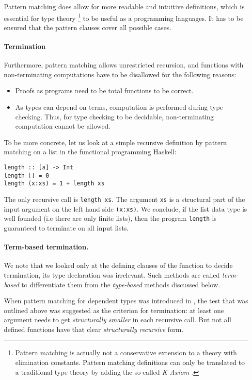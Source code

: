 Pattern matching does allow for more readable and intuitive definitions, which is essential for type theory \footnote{Pattern matching is actually not a conservative extension to a theory with elimination constants. 
Pattern matching definitions can only be translated to a traditional type theory by adding the so-called \emph{K Axiom} \cite{hofmann95groupoid,GoguHMcBrCM2006}. 
} to be useful as a programming languages. 
It has to be ensured that the pattern clauses cover all possible cases.
\paragraph*{Termination}
Furthermore, pattern matching allows unrestricted recursion, and functions with non-terminating computations have to be disallowed for the following reasons: 
\begin{itemize}
\item
Proofs as programs need to be total functions to be correct.
\item
As types can depend on terms, computation is performed during type checking.
Thus, for type checking to be decidable, non-terminating computation cannot be allowed. 
\end{itemize}
To be more concrete, let us look at a simple recursive definition by pattern matching on a list in the functional programming Haskell: 
\begin{verbatim}
length :: [a] -> Int
length [] = 0
length (x:xs) = 1 + length xs 
\end{verbatim}
The only recursive call is \texttt{length xs}.
The argument \texttt{xs} is a structural part of the input argument on the left hand side \texttt{(x:xs)}.
We conclude, if the list data type is well founded (i.e there are only finite lists), then the program \texttt{length} is guaranteed to terminate on all input lists.

\paragraph*{Term-based termination.}
We note that we looked only at the defining clauses of the function to decide termination, its type declaration was irrelevant. Such methods are called \emph{term-based} to differentiate them from the \emph{type-based} methods discussed below.

When pattern matching for dependent types was introduced in  \cite{coquand92pattern},
the test that was outlined above was suggested as the criterion for termination:
at least one argument needs to get \emph{structurally smaller} in each recursive call.
But not all defined functions have that clear \emph{structurally recursive} form.

